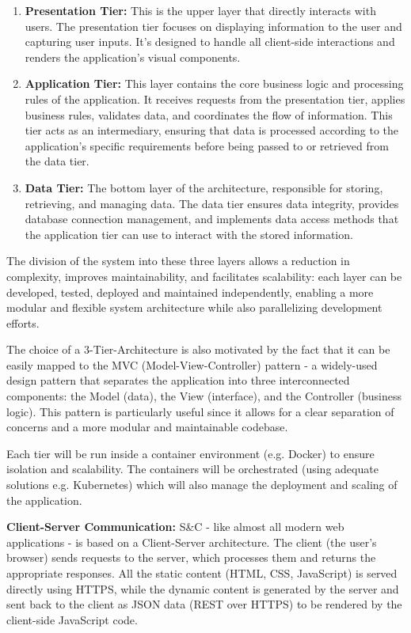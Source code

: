 \begin{enumerate}
      \item \textbf{Presentation Tier:} This is the upper layer that directly interacts with users. The presentation tier
            focuses on displaying information to the user and capturing user inputs. It's designed to handle all client-side
            interactions and renders the application's visual components.
      \item \textbf{Application Tier:} This layer contains the core business logic and processing rules of the
            application. It receives requests from the presentation tier, applies business rules, validates data, and
            coordinates the flow of information. This tier acts as an intermediary, ensuring that data is processed
            according to the application's specific requirements before being passed to or retrieved from the data tier.
      \item \textbf{Data Tier:} The bottom layer of the architecture, responsible for storing, retrieving, and managing
            data. The data tier ensures data integrity, provides database connection management, and implements data
            access methods that the application tier can use to interact with the stored information.
\end{enumerate}

The division of the system into these three layers allows a reduction in complexity, improves maintainability, and
facilitates scalability: each layer can be developed, tested, deployed and maintained independently, enabling a more
modular and flexible system architecture while also parallelizing development efforts.

The choice of a 3-Tier-Architecture is also motivated by the fact that it can be easily mapped to the MVC
(Model-View-Controller) pattern - a widely-used design pattern that separates the application into three interconnected
components: the Model (data), the View (interface), and the Controller (business logic). This pattern is particularly
useful since it allows for a clear separation of concerns and a more modular and maintainable codebase.

Each tier will be run inside a container environment (e.g. Docker) to ensure isolation and scalability. The containers
will be orchestrated (using adequate solutions e.g. Kubernetes) which will also manage the deployment and scaling of
the application.

\par{\textbf{Client-Server Communication:}} S\&C - like almost all modern web applications - is based on a
Client-Server architecture. The client (the user's browser) sends requests to the server, which processes them and
returns the appropriate responses. All the static content (HTML, CSS, JavaScript) is served directly using HTTPS, while
the dynamic content is generated by the server and sent back to the client as JSON data (REST over HTTPS) to be
rendered by the client-side JavaScript code.

